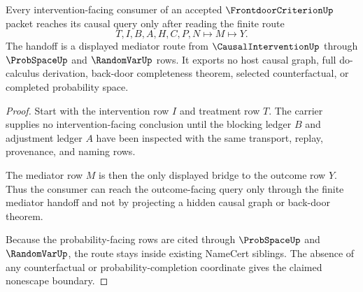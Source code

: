 \begin{theorem}
\label{thm:frontdoor-criterion-causal-handoff}
Every intervention-facing consumer of an accepted $\FrontdoorCriterionUp$ packet reaches its causal query only after reading the finite route
$$
T,I,B,A,H,C,P,N \longmapsto M \longmapsto Y .
$$
The handoff is a displayed mediator route from $\CausalInterventionUp$ through $\ProbSpaceUp$ and $\RandomVarUp$ rows. It exports no host causal graph, full do-calculus derivation, back-door completeness theorem, selected counterfactual, or completed probability space.
\end{theorem}
\begin{proof}
Start with the intervention row $I$ and treatment row $T$. The carrier supplies no intervention-facing conclusion until the blocking ledger $B$ and adjustment ledger $A$ have been inspected with the same transport, replay, provenance, and naming rows.

The mediator row $M$ is then the only displayed bridge to the outcome row $Y$. Thus the consumer can reach the outcome-facing query only through the finite mediator handoff and not by projecting a hidden causal graph or back-door theorem.

Because the probability-facing rows are cited through $\ProbSpaceUp$ and $\RandomVarUp$, the route stays inside existing NameCert siblings. The absence of any counterfactual or probability-completion coordinate gives the claimed nonescape boundary.
\end{proof}


\begin{closurestatus}{\FrontdoorCriterionUp}
  \theoryclosure{\seedClosure}
  \formalstatus{\unformalizedV}
\end{closurestatus}
